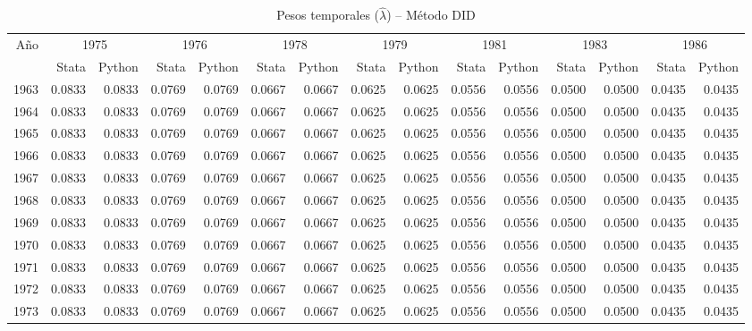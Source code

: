 \begin{table}[H]
\centering
\caption{Pesos temporales ($\hat{\lambda}$) -- M\'etodo DID}
\label{tab:lambda_did}
\footnotesize
\begin{tabular}{rrrrrrrrrrrrrrr}
\toprule
A\~no & \multicolumn{2}{c}{1975} & \multicolumn{2}{c}{1976} & \multicolumn{2}{c}{1978} & \multicolumn{2}{c}{1979} & \multicolumn{2}{c}{1981} & \multicolumn{2}{c}{1983} & \multicolumn{2}{c}{1986} \\
 & \scriptsize Stata & \scriptsize Python & \scriptsize Stata & \scriptsize Python & \scriptsize Stata & \scriptsize Python & \scriptsize Stata & \scriptsize Python & \scriptsize Stata & \scriptsize Python & \scriptsize Stata & \scriptsize Python & \scriptsize Stata & \scriptsize Python \\
\midrule
1963 & 0.0833 & 0.0833 & 0.0769 & 0.0769 & 0.0667 & 0.0667 & 0.0625 & 0.0625 & 0.0556 & 0.0556 & 0.0500 & 0.0500 & 0.0435 & 0.0435 \\
1964 & 0.0833 & 0.0833 & 0.0769 & 0.0769 & 0.0667 & 0.0667 & 0.0625 & 0.0625 & 0.0556 & 0.0556 & 0.0500 & 0.0500 & 0.0435 & 0.0435 \\
1965 & 0.0833 & 0.0833 & 0.0769 & 0.0769 & 0.0667 & 0.0667 & 0.0625 & 0.0625 & 0.0556 & 0.0556 & 0.0500 & 0.0500 & 0.0435 & 0.0435 \\
1966 & 0.0833 & 0.0833 & 0.0769 & 0.0769 & 0.0667 & 0.0667 & 0.0625 & 0.0625 & 0.0556 & 0.0556 & 0.0500 & 0.0500 & 0.0435 & 0.0435 \\
1967 & 0.0833 & 0.0833 & 0.0769 & 0.0769 & 0.0667 & 0.0667 & 0.0625 & 0.0625 & 0.0556 & 0.0556 & 0.0500 & 0.0500 & 0.0435 & 0.0435 \\
1968 & 0.0833 & 0.0833 & 0.0769 & 0.0769 & 0.0667 & 0.0667 & 0.0625 & 0.0625 & 0.0556 & 0.0556 & 0.0500 & 0.0500 & 0.0435 & 0.0435 \\
1969 & 0.0833 & 0.0833 & 0.0769 & 0.0769 & 0.0667 & 0.0667 & 0.0625 & 0.0625 & 0.0556 & 0.0556 & 0.0500 & 0.0500 & 0.0435 & 0.0435 \\
1970 & 0.0833 & 0.0833 & 0.0769 & 0.0769 & 0.0667 & 0.0667 & 0.0625 & 0.0625 & 0.0556 & 0.0556 & 0.0500 & 0.0500 & 0.0435 & 0.0435 \\
1971 & 0.0833 & 0.0833 & 0.0769 & 0.0769 & 0.0667 & 0.0667 & 0.0625 & 0.0625 & 0.0556 & 0.0556 & 0.0500 & 0.0500 & 0.0435 & 0.0435 \\
1972 & 0.0833 & 0.0833 & 0.0769 & 0.0769 & 0.0667 & 0.0667 & 0.0625 & 0.0625 & 0.0556 & 0.0556 & 0.0500 & 0.0500 & 0.0435 & 0.0435 \\
1973 & 0.0833 & 0.0833 & 0.0769 & 0.0769 & 0.0667 & 0.0667 & 0.0625 & 0.0625 & 0.0556 & 0.0556 & 0.0500 & 0.0500 & 0.0435 & 0.0435 \\

\end{tabular}
\end{table}
